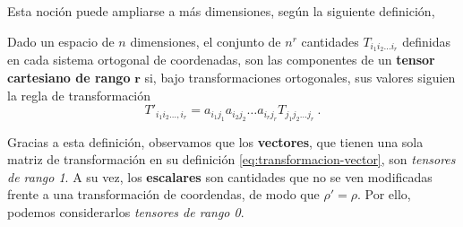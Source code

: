 Esta noción puede ampliarse a más dimensiones, según la siguiente definición,
\begin{defi} 
    Dado un espacio de $n$ dimensiones, el conjunto de $n^r$ cantidades $T_{i_1 i_2 \dots i_r}$ definidas en cada sistema ortogonal de coordenadas, son las componentes de un \textbf{tensor cartesiano de rango} $\mathbf{r}$ si, bajo transformaciones ortogonales, sus valores siguien la regla de transformación
    \begin{equation}
        T'_{i_1 i_2 \dots, i_r} = a_{i_1 j_1} a_{i_2 j_2} \dots a_{i_r j_r} T_{j_1 j_2 \dots j_r} \ . 
    \end{equation}
\end{defi}

Gracias a esta definición, observamos que los \textbf{vectores}, que tienen una sola matriz de transformación en su definición \eqref{eq:transformacion-vector}, son \emph{tensores de rango 1}. A su vez, los \textbf{escalares} son cantidades que no se ven modificadas frente a una transformación de coordendas, de modo que $\rho' = \rho$. Por ello, podemos considerarlos \emph{tensores de rango 0}.

